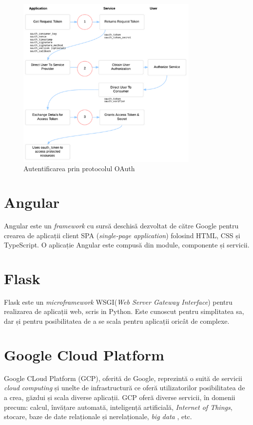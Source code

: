  
 \begin{figure}[!htbp]
    \begin{center}
        \includegraphics[width=0.8\textwidth]{images/oauth.png}
        \caption{Autentificarea prin protocolul OAuth\cite{oauth-bible}}
    \end{center}
\end{figure}

\section{Angular}
Angular este un \textit{framework} cu sursă deschisă dezvoltat de către Google pentru crearea de aplicații client  SPA (\textit{single-page application}) folosind HTML, CSS și TypeScript. O aplicație Angular este compusă din module, componente și servicii.

\section{Flask}
Flask este un \textit{microframework} WSGI(\textit{Web Server Gateway Interface}) pentru realizarea de aplicații web, scris in Python. Este cunoscut pentru simplitatea sa, dar și pentru posibilitatea de a se scala pentru aplicații oricât de complexe.

\section{Google Cloud Platform}
Google CLoud Platform (GCP), oferită de Google, reprezintă o suită de servicii \textit{cloud computing} și unelte de infrastructură ce oferă utilizatorilor posibilitatea de a crea, găzdui și scala diverse aplicații. GCP oferă diverse servicii, în domenii precum: calcul, învățare automată, inteligență artificială, \textit{Internet of Things}, stocare, baze de date relaționale și nerelaționale, \textit{big data} , etc.
